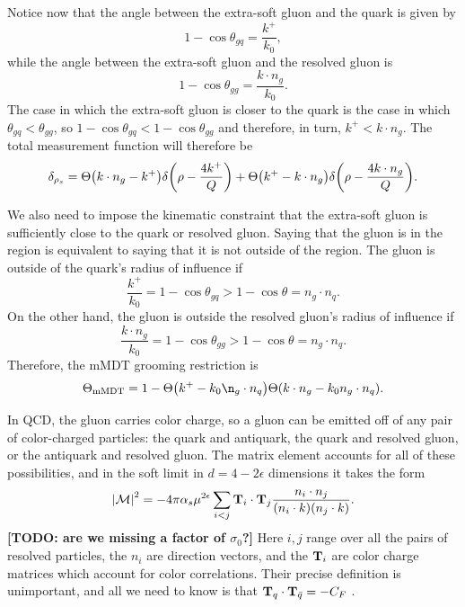 \documentclass[../thesis.tex]{subfiles}
\providecommand{\mMDT}{\mathrm{mMDT}}
\providecommand{\cM}{\mathcal{M}}
\begin{document}
	Notice now that the angle between the extra-soft gluon and the quark is given by
	\begin{equation}
		1 - \cos\theta_{gq} = \frac{k^+}{k_0},
	\end{equation}
	while the angle between the extra-soft gluon and the resolved gluon is
	\begin{equation}
		1 - \cos\theta_{gg} = \frac{k \cdot n_g}{k_0}.
	\end{equation}
	The case in which the extra-soft gluon is closer to the quark is the case in which $\theta_{gq} < \theta_{gg}$, so $1 - \cos\theta_{gq} < 1 - \cos\theta_{gg}$ and therefore, in turn, $k^+ < k \cdot n_g$. The total measurement function will therefore be
	\begin{equation}
		\delta_{\rho_s} = \Theta\qty(k \cdot n_g - k^+) \delta\qty(\rho - \frac{4 k^+}{Q}) + \Theta\qty(k^+ - k \cdot n_g) \delta\qty(\rho - \frac{4 k \cdot n_g}{Q}).
	\end{equation}

	We also need to impose the kinematic constraint that the extra-soft gluon is sufficiently close to the quark or resolved gluon. Saying that the gluon is in the region is equivalent to saying that it is not outside of the region. The gluon is outside of the quark's radius of influence if
	\begin{equation}
		\frac{k^+}{k_0} = 1 - \cos\theta_{gq} > 1 - \cos\theta = n_g \cdot n_q.
	\end{equation}
	On the other hand, the gluon is outside the resolved gluon's radius of influence if
	\begin{equation}
		\frac{k \cdot n_g}{k_0} = 1- \cos\theta_{gg} > 1 - \cos\theta = n_g \cdot n_q.
	\end{equation}
	Therefore, the mMDT grooming restriction is
	\begin{equation}
		\Theta_\mMDT = 1 - \Theta\qty(k^+ - k_0 \n_g \cdot n_q) \Theta(k\cdot n_g - k_0 n_g \cdot n_q).
	\end{equation}

	In QCD, the gluon carries color charge, so a gluon can be emitted off of any pair of color-charged particles: the quark and antiquark, the quark and resolved gluon, or the antiquark and resolved gluon. The matrix element accounts for all of these possibilities, and in the soft limit in $d = 4 - 2\epsilon$ dimensions it takes the form \cite{catani_infrared_2000}
	\begin{equation}
		\abs{\cM}^2 = -4\pi\alpha_s \mu^{2\epsilon} \sum_{i < j} \vb{T}_i \cdot \vb{T}_j \frac{n_i \cdot n_j}{(n_i \cdot k) (n_j \cdot k)}.
	\end{equation}
	{\color{red}\textbf{[TODO: are we missing a factor of $\sigma_0$?]}} Here $i, j$ range over all the pairs of resolved particles, the $n_i$ are direction vectors, and the $\vb{T}_i$ are color charge matrices which account for color correlations. Their precise definition is unimportant, and all we need to know is that $\vb{T}_q \cdot \vb{T}_{\bar q} = -C_F$ \cite{catani_infrared_2000}.
\end{document}
